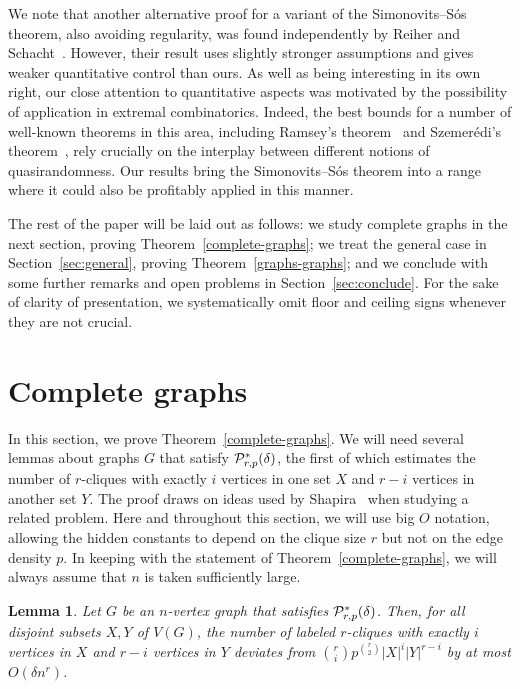 \documentclass[11pt]{article}
\newtheorem{lemma}{Lemma}[section]
\begin{document}
We note that another alternative proof for a variant of the Simonovits--S\'os theorem, also avoiding regularity, was found independently by Reiher and Schacht~\cite{RS16}. However, their result uses slightly stronger assumptions and gives weaker quantitative control than ours. As well as being interesting in its own right, our close attention to quantitative aspects was motivated by the possibility of application in extremal combinatorics. Indeed, the best bounds for a number of well-known theorems in this area, including Ramsey's theorem~\cite{C09} and Szemer\'edi's theorem~\cite{G01}, rely crucially on the interplay between different notions of quasirandomness. Our results bring the Simonovits--S\'os theorem into a range where it could also be profitably applied in this manner.

The rest of the paper will be laid out as follows: we study complete graphs in the next section, proving Theorem~\ref{complete-graphs}; we treat the general case in Section~\ref{sec:general}, proving Theorem~\ref{graphs-graphs}; and we conclude with some further remarks and open problems in Section~\ref{sec:conclude}. For the sake of clarity of presentation, we systematically omit floor and ceiling signs whenever they are not crucial.

\section{Complete graphs} \label{sec:complete}

In this section, we prove Theorem~\ref{complete-graphs}. We will need several lemmas about graphs $G$ that satisfy ${\cal P}^*_{r,p}(\delta)$, the first of which estimates the number of $r$-cliques with exactly $i$ vertices in one set $X$ and $r-i$ vertices in another set $Y$. The proof draws on ideas used by Shapira~\cite{S08} when studying a related problem. Here and throughout this section, we will use big $O$ notation, allowing the hidden constants to depend on the clique size $r$ but not on the edge density $p$. In keeping with the statement of Theorem~\ref{complete-graphs}, we will always assume that $n$ is taken sufficiently large.

\begin{lemma}\label{two-sets}
Let $G$ be an $n$-vertex graph that satisfies
${\cal P}^*_{r,p}(\delta)$. Then, for all disjoint subsets $X,Y$ of $V(G)$, the number of labeled $r$-cliques with exactly $i$ vertices in $X$ and $r-i$ vertices in $Y$ deviates from ${r \choose i} p^{{r \choose 2}}|X|^i|Y|^{r-i}$ by at most $O(\delta n^r)$.
\end{lemma}
\end{document}
